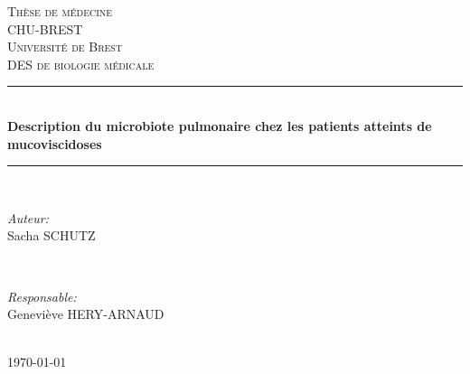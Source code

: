 \documentclass[12pt,a4paper]{article}
\newcommand{\HRule}{\rule{\linewidth}{0.5mm}} %
\begin{document}
\begin{titlepage}
\center







\textsc{\LARGE Thèse de médecine}\\[1.5cm]
\textsc{\Large CHU-BREST}\\[0.5cm]
\textsc{\large Université de Brest\\
DES de biologie médicale \
}\\[0.5cm]
 
\HRule \\[0.8cm]

{ \huge \bfseries Description du microbiote pulmonaire chez les patients atteints de mucoviscidoses}\\[0.4cm]

\HRule \\[1.2cm]
 
\begin{minipage}{0.4\textwidth}
 \begin{flushleft} \large
     \emph{Auteur:}\\
     Sacha SCHUTZ
 \end{flushleft}
\end{minipage}
~
\begin{minipage}{0.4\textwidth}
 \begin{flushright} \large
     \emph{Responsable:} \\
     Geneviève HERY-ARNAUD
 \end{flushright}
\end{minipage}\\[2cm]
 
{\large \today}\\[8cm] %
 

\end{titlepage}
\end{document}
